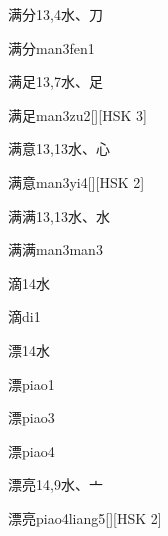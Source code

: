 \begin{entry}{满分}{13,4}{⽔、⼑}
  \begin{phonetics}{满分}{man3fen1}
  \end{phonetics}
\end{entry}

\begin{entry}{满足}{13,7}{⽔、⾜}
  \begin{phonetics}{满足}{man3zu2}[][HSK 3]
  \end{phonetics}
\end{entry}

\begin{entry}{满意}{13,13}{⽔、⼼}
  \begin{phonetics}{满意}{man3yi4}[][HSK 2]
  \end{phonetics}
\end{entry}

\begin{entry}{满满}{13,13}{⽔、⽔}
  \begin{phonetics}{满满}{man3man3}
  \end{phonetics}
\end{entry}

\begin{entry}{滴}{14}{⽔}
  \begin{phonetics}{滴}{di1}
  \end{phonetics}
\end{entry}

\begin{entry}{漂}{14}{⽔}
  \begin{phonetics}{漂}{piao1}
  \end{phonetics}
  \begin{phonetics}{漂}{piao3}
  \end{phonetics}
  \begin{phonetics}{漂}{piao4}
  \end{phonetics}
\end{entry}

\begin{entry}{漂亮}{14,9}{⽔、⼇}
  \begin{phonetics}{漂亮}{piao4liang5}[][HSK 2]
  \end{phonetics}
\end{entry}

